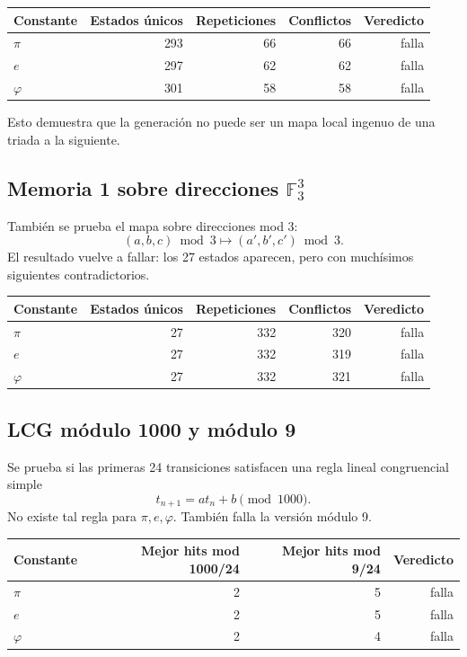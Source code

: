 \documentclass[11pt,a4paper]{article}
\begin{document}
\begin{longtable}{lrrrr}
\toprule
Constante & Estados únicos & Repeticiones & Conflictos & Veredicto\\
\midrule
\(\pi\) & 293 & 66 & 66 & falla\\
\(e\) & 297 & 62 & 62 & falla\\
\(\varphi\) & 301 & 58 & 58 & falla\\
\bottomrule
\end{longtable}

Esto demuestra que la generación no puede ser un mapa local ingenuo de una triada a la siguiente.

\subsection{Memoria 1 sobre direcciones \(\mathbb F_3^3\)}
También se prueba el mapa sobre direcciones mod 3:
\[
(a,b,c)\bmod3\longmapsto(a',b',c')\bmod3.
\]
El resultado vuelve a fallar: los 27 estados aparecen, pero con muchísimos siguientes contradictorios.

\begin{longtable}{lrrrr}
\toprule
Constante & Estados únicos & Repeticiones & Conflictos & Veredicto\\
\midrule
\(\pi\) & 27 & 332 & 320 & falla\\
\(e\) & 27 & 332 & 319 & falla\\
\(\varphi\) & 27 & 332 & 321 & falla\\
\bottomrule
\end{longtable}

\subsection{LCG módulo 1000 y módulo 9}
Se prueba si las primeras 24 transiciones satisfacen una regla lineal congruencial simple
\[
t_{n+1}=a t_n+b\pmod{1000}.
\]
No existe tal regla para \(\pi,e,\varphi\). También falla la versión módulo 9.

\begin{longtable}{lrrr}
\toprule
Constante & Mejor hits mod 1000/24 & Mejor hits mod 9/24 & Veredicto\\
\midrule
\(\pi\) & 2 & 5 & falla\\
\(e\) & 2 & 5 & falla\\
\(\varphi\) & 2 & 4 & falla\\
\bottomrule
\end{longtable}
\end{document}

